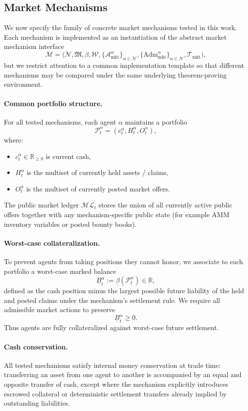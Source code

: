 \documentclass[letterpaper]{article} %
\begin{document}
\subsection{Market Mechanisms}

We now specify the family of concrete market mechanisms tested in this work. Each mechanism is implemented as an instantiation of the abstract market mechanism interface
\[
\mathscr M=\Big(\mathcal N,\mathfrak M,\beta,\mathcal W,\{\mathcal A^\alpha_{\mathrm{mkt}}\}_{\alpha\in\mathcal N},
\{\mathrm{Adm}^\alpha_{\mathrm{mkt}}\}_{\alpha\in\mathcal N},\mathcal T_{\mathrm{mkt}}\Big),
\]
but we restrict attention to a common implementation template so that different mechanisms may be compared under the same underlying theorem-proving environment.

\paragraph{Common portfolio structure.}
For all tested mechanisms, each agent $\alpha$ maintains a portfolio
\[
\mathcal P^\alpha_t=(c^\alpha_t,H^\alpha_t,O^\alpha_t),
\]
where:
\begin{itemize}
    \item $c^\alpha_t\in\mathbb R_{\ge 0}$ is current cash,
    \item $H^\alpha_t$ is the multiset of currently held assets / claims,
    \item $O^\alpha_t$ is the multiset of currently posted market offers.
\end{itemize}
The public market ledger $\mathcal{ML}_t$ stores the union of all currently active public offers together with any mechanism-specific public state (for example AMM inventory variables or posted bounty books).

\paragraph{Worst-case collateralization.}
To prevent agents from taking positions they cannot honor, we associate to each portfolio a worst-case marked balance
\[
\underline B^\alpha_t := \underline\beta(\mathcal P^\alpha_t)\in\mathbb R,
\]
defined as the cash position minus the largest possible future liability of the held and posted claims under the mechanism's settlement rule. We require all admissible market actions to preserve
\[
\underline B^\alpha_t \ge 0.
\]
Thus agents are fully collateralized against worst-case future settlement.

\paragraph{Cash conservation.}
All tested mechanisms satisfy internal money conservation at trade time: transferring an asset from one agent to another is accompanied by an equal and opposite transfer of cash, except where the mechanism explicitly introduces escrowed collateral or deterministic settlement transfers already implied by outstanding liabilities.
\end{document}
